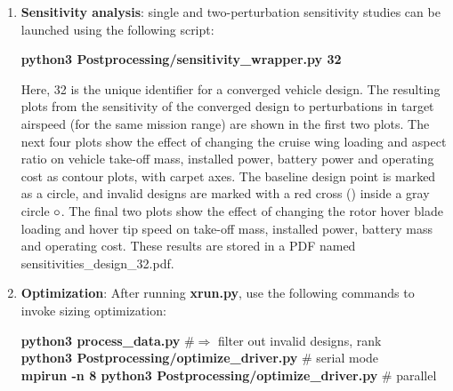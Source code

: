 \begin{enumerate}


\item \textbf{Sensitivity analysis}: single and two-perturbation sensitivity studies can be launched using the following script:
\begin{center}
\textbf{python3 Postprocessing/sensitivity\_wrapper.py 32}
\end{center}
Here, 32 is the unique identifier for a converged vehicle design. The resulting plots from the sensitivity of the converged design to perturbations in target airspeed (for the same mission range) are shown in the first two plots. The next four plots show the effect of changing the cruise wing loading and aspect ratio on vehicle take-off mass, installed power, battery power and operating cost as contour plots, with carpet axes. The baseline design point is marked as a circle, and invalid designs are marked with a red cross (\red{$\times$}) inside a gray circle \textcolor{gray}{$\mathlarger{\circ}$}. The final two plots show the effect of changing the rotor hover blade loading and hover tip speed on take-off mass, installed power, battery mass and operating cost. These results are stored in a PDF named sensitivities\_design\_32.pdf.



\item \textbf{Optimization}: After running \textbf{xrun.py}, use the following commands to invoke sizing optimization:
\begin{flushleft}

\textbf{python3 process\_data.py}  \qquad  \#$\Rightarrow$ filter out invalid designs, rank\\
\textbf{python3 Postprocessing/optimize\_driver.py} \qquad \# serial mode\\
\textbf{mpirun -n 8 python3 Postprocessing/optimize\_driver.py} \# parallel
\end{flushleft}


\end{enumerate}
